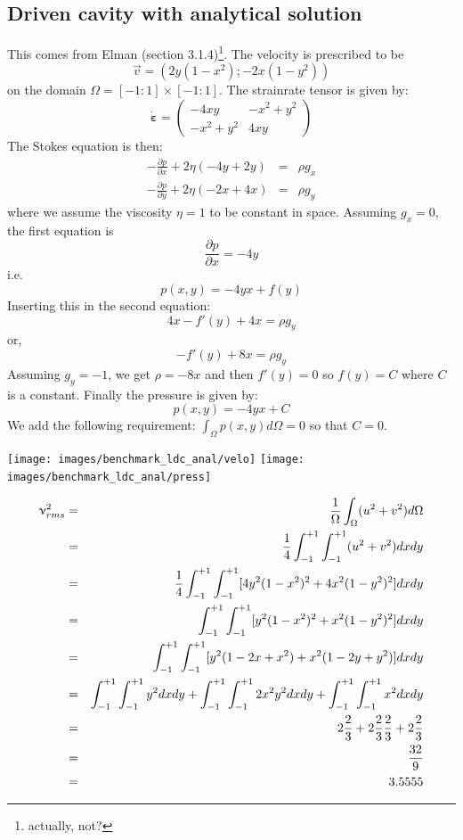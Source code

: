 \subsection{Driven cavity with analytical solution} \label{sec:ldc_anal}

This comes from Elman \etal \cite{elsw}(section 3.1.4)\footnote{actually, not?}. The velocity is prescribed to be
\[
{\vec v}=(2y(1-x^2) ; -2x(1-y^2) )
\]
on the domain $\Omega=[-1:1]\times[-1:1]$. The strainrate tensor is given by:
\[
\dot{\bm \varepsilon}=
\left(
\begin{array}{cc}
-4xy & -x^2+y^2  \\
-x^2+y^2 & 4xy   
\end{array}
\right)
\]
The Stokes equation is then:
\begin{eqnarray}
-\frac{\partial p}{\partial x} + 2\eta ( -4y + 2y ) &=& \rho g_x \\
-\frac{\partial p}{\partial y} + 2\eta ( -2x + 4x ) &=& \rho g_y
\end{eqnarray}
where we assume the viscosity $\eta=1$ to be constant in space.
Assuming $g_x=0$, the first equation is
\[
\frac{\partial p}{\partial x} = - 4 y
\]
i.e.
\[
p(x,y)= -4  y x +f(y)
\]
Inserting this in the second equation:
\[
4  x - f'(y) + 4 x  = \rho g_y
\]
or,
\[
-f'(y) + 8  x  = \rho g_y
\]
Assuming $g_y=-1$, we get $\rho=-8x$ and then $f'(y)=0$ so $f(y)=C$ where $C$
is a constant.
Finally the pressure is given by:
\[
p(x,y)=-4  y x + C
\]
We add the following requirement: $\int_\Omega p(x,y) d\Omega =0$ so that $C=0$.

\begin{center}
\texttt{[image: images/benchmark\_ldc\_anal/velo]}
\texttt{[image: images/benchmark\_ldc\_anal/press]}
\end{center}

\begin{eqnarray}
\upnu_{rms}^2 
&=& \frac{1}{\Omega} \int_\Omega (u^2+v^2) d\Omega \nonumber\\
&=& \frac{1}{4} \int_{-1}^{+1}\int_{-1}^{+1} (u^2+v^2) dxdy \nonumber\\
&=& \frac{1}{4} \int_{-1}^{+1}\int_{-1}^{+1} [ 4y^2(1-x^2)^2 + 4x^2(1-y^2)^2   ] dxdy \nonumber\\
&=& \int_{-1}^{+1}\int_{-1}^{+1} [ y^2(1-x^2)^2 + x^2(1-y^2)^2   ] dxdy \nonumber\\
&=& \int_{-1}^{+1}\int_{-1}^{+1} [ y^2(1-2x+x^2) + x^2(1-2y+y^2)  ] dxdy \nonumber\\
&=& \int_{-1}^{+1}\int_{-1}^{+1} y^2 dxdy
+ \int_{-1}^{+1}\int_{-1}^{+1} 2 x^2 y^2 dxdy
+ \int_{-1}^{+1}\int_{-1}^{+1} x^2 dxdy\nonumber\\
&=& 2  \frac23 + 2 \frac23\frac23 + 2 \frac23 \nonumber\\
&=& \frac{32}{9} \nonumber\\
&=& 3.5555
\end{eqnarray}

